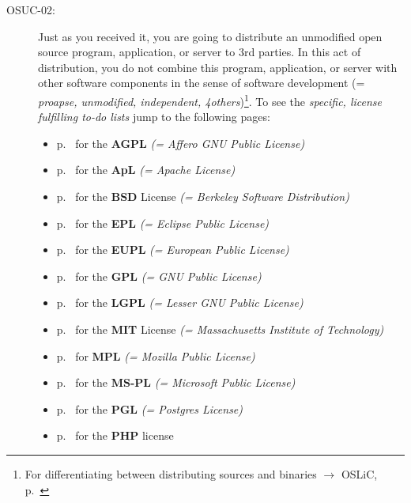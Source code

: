 \begin{description}
\item[OSUC-02:]\label{OSUC-02-DEF} Just as you received it, you are going to
distribute an unmodified open source program, application, or server to 3rd
parties. In this act of distribution, you do not combine this program,
application, or server with other software components in the sense of software
development (= \textit{proapse, unmodified, independent, 4others})\footnote{For
differentiating between distributing sources and binaries $\rightarrow$ OSLiC,
p.\ \pageref{sec:SourceBinaryDifference}}. To see the \textit{specific, license
fulfilling to-do lists} jump to the following pages:
   \begin{itemize}
    \item p.\ \pageref{OSUC-02-AGPL} for the \textbf{AGPL}
      \textit{(= Affero GNU Public License)} 
    \item p.\ \pageref{OSUC-02-Apache20} for the \textbf{ApL}
      \textit{(= Apache License)}
    \item p.\ \pageref{OSUC-02-BSD} for the \textbf{BSD} License
      \textit{(= Berkeley Software Distribution)}
    \item p.\ \pageref{OSUC-02-EPL} for the \textbf{EPL}
      \textit{(= Eclipse Public License)}     
    \item p.\ \pageref{OSUC-02-EUPL} for the \textbf{EUPL}
      \textit{(= European Public License)} 
    \item p.\ \pageref{OSUC-02-GPL} for the \textbf{GPL}
       \textit{(= GNU Public License)} 
    \item p.\ \pageref{OSUC-02-LGPL} for the \textbf{LGPL}
      \textit{(= Lesser GNU Public License)}           
    \item p.\ \pageref{OSUC-02-MIT} for the \textbf{MIT} License
       \textit{(= Massachusetts Institute of Technology)} 
    \item p.\ \pageref{OSUC-02-MPL} for \textbf{MPL}
      \textit{(= Mozilla Public License)}     
    \item p.\ \pageref{OSUC-02-MS-PL} for the \textbf{MS-PL}
      \textit{(= Microsoft Public License)} 
    \item p.\ \pageref{OSUC-02-PGL} for the \textbf{PGL}
      \textit{(= Postgres License)} 
    \item p.\ \pageref{OSUC-02-PHP} for the \textbf{PHP} license 
  \end{itemize}


\end{description}
